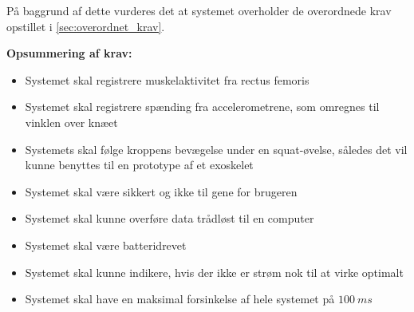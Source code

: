 På baggrund af dette vurderes det at systemet overholder de overordnede krav opstillet i \autoref{sec:overordnet_krav}. 

\vspace{3mm}
\textbf{Opsummering af krav:}
\begin{itemize}
\item[\text{\sffamily \checkmark}] Systemet skal registrere muskelaktivitet fra rectus femoris 
\item[\text{\sffamily \checkmark}] Systemet skal registrere spænding fra accelerometrene, som omregnes til vinklen over knæet
\item[\text{\sffamily \checkmark}] Systemets skal følge kroppens bevægelse under en squat-øvelse, således det vil kunne benyttes til en prototype af et exoskelet
\item[\text{\sffamily \checkmark}] Systemet skal være sikkert og ikke til gene for brugeren 
\item[\text{\sffamily \checkmark}] Systemet skal kunne overføre data trådløst til en computer
\item[\text{\sffamily \checkmark}] Systemet skal være batteridrevet
\item[\text{\sffamily \checkmark}] Systemet skal kunne indikere, hvis der ikke er strøm nok til at virke optimalt
\item[\text{\sffamily \checkmark}] Systemet skal have en maksimal forsinkelse af hele systemet på $100~ms$
\end{itemize}
